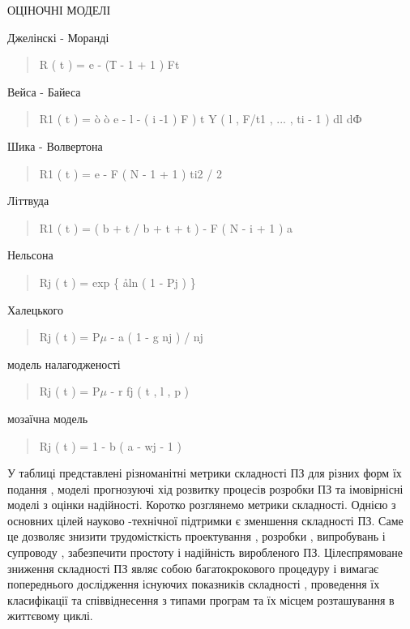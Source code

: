 ОЦІНОЧНІ МОДЕЛІ

Джелінскі - Моранді
\begin{quote}

R ( t ) = e - (Т - 1 + 1 ) Ft
\end{quote}

Вейса - Байеса
\begin{quote}

R1 ( t ) = ò ò e - l - ( i -1 ) F ) t Y ( l , F/t1 , ... , ti - 1 ) dl dФ
\end{quote}

Шика - Волвертона
\begin{quote}

R1 ( t ) = e - F ( N - 1 + 1 ) ti2 / 2
\end{quote}

Літтвуда
\begin{quote}

R1 ( t ) = ( b + t / b + t + t ) - F ( N - i + 1 ) a
\end{quote}

Нельсона
\begin{quote}

Rj ( t ) = exp \{ åln ( 1 - Pj ) \}
\end{quote}

Халецького
\begin{quote}

Rj ( t ) = P\(\mu\) - a ( 1 - g nj ) / nj
\end{quote}

модель налагодженості
\begin{quote}

Rj ( t ) = P\(\mu\) - r fj ( t , l , p )
\end{quote}

мозаїчна модель
\begin{quote}

Rj ( t ) = 1 - b ( a - wj - 1 )
\end{quote}

У таблиці представлені різноманітні метрики складності ПЗ для різних форм їх подання , моделі прогнозуючі хід розвитку процесів розробки ПЗ та імовірнісні моделі з оцінки надійності.
Коротко розглянемо метрики складності. Однією з основних цілей науково -технічної підтримки є зменшення складності ПЗ. Саме це дозволяє знизити трудомісткість проектування , розробки , випробувань і супроводу , забезпечити простоту і надійність виробленого ПЗ. Цілеспрямоване зниження складності ПЗ являє собою багатокрокового процедуру і вимагає попереднього дослідження існуючих показників складності , проведення їх класифікації та співвіднесення з типами програм та їх місцем розташування в життєвому циклі.

